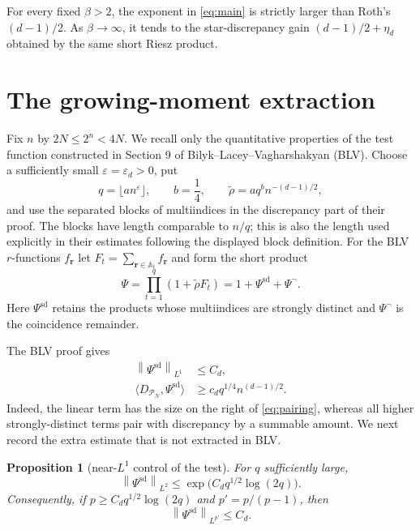 \documentclass[11pt]{article}
\newtheorem{proposition}{Proposition}
\newcommand{\norm}[2]{\left\lVert #1\right\rVert_{#2}}
\begin{document}
For every fixed $\beta>2$, the exponent in \eqref{eq:main} is strictly larger
than Roth's $(d-1)/2$.  As $\beta\to\infty$, it tends to the star-discrepancy
gain $(d-1)/2+\eta_d$ obtained by the same short Riesz product.

\section{The growing-moment extraction}

Fix $n$ by $2N\leq2^n<4N$.  We recall only the quantitative properties of
the test function constructed in Section 9 of
Bilyk--Lacey--Vagharshakyan (BLV).  Choose a sufficiently small
$\varepsilon=\varepsilon_d>0$, put
\[
 q=\lfloor a n^\varepsilon\rfloor,\qquad b=\frac14,
 \qquad \widetilde\rho=a q^b n^{-(d-1)/2},
\]
and use the separated blocks of multiindices in the discrepancy part of their
proof.  The blocks have length comparable to $n/q$; this is also the length
used explicitly in their estimates following the displayed block definition.
For the BLV $r$-functions $f_{\mathbf r}$ let
$F_t=\sum_{\mathbf r\in\mathbb A_t}f_{\mathbf r}$ and form the short product
\[
 \Psi=\prod_{t=1}^q(1+\widetilde\rho F_t)
      =1+\Psi^{\mathrm{sd}}+\Psi^{\neg}.
\]
Here $\Psi^{\mathrm{sd}}$ retains the products whose multiindices are strongly
distinct and $\Psi^{\neg}$ is the coincidence remainder.

The BLV proof gives
\begin{align}
 \norm{\Psi^{\mathrm{sd}}}{L^1}&\leq C_d,
 \label{eq:l1}\\
 \langle D_{\mathcal P_N},\Psi^{\mathrm{sd}}\rangle
 &\geq c_d q^{1/4}n^{(d-1)/2}.
 \label{eq:pairing}
\end{align}
Indeed, the linear term has the size on the right of \eqref{eq:pairing},
whereas all higher strongly-distinct terms pair with discrepancy by a summable
amount.  We next record the extra estimate that is not extracted in BLV.

\begin{proposition}[near-$L^1$ control of the test]\label{prop:test}
For $q$ sufficiently large,
\begin{equation}\label{eq:l2test}
 \norm{\Psi^{\mathrm{sd}}}{L^2}
 \leq \exp\!\bigl(C_d q^{1/2}\log(2q)\bigr).
\end{equation}
Consequently, if $p\geq C_d q^{1/2}\log(2q)$ and
$p'=p/(p-1)$, then
\begin{equation}\label{eq:dualnorm}
 \norm{\Psi^{\mathrm{sd}}}{L^{p'}}\leq C_d.
\end{equation}
\end{proposition}
\end{document}
